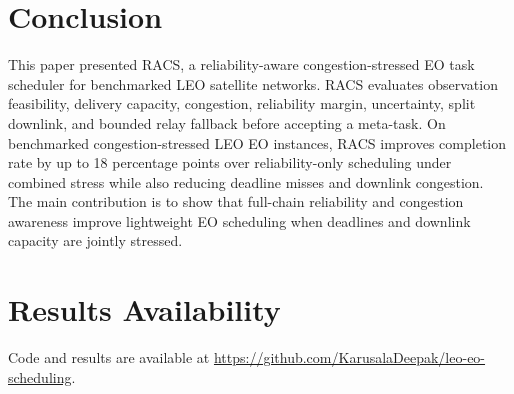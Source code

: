 \documentclass[conference]{IEEEtran}
\begin{document}
\section{Conclusion}
This paper presented RACS, a reliability-aware congestion-stressed EO task scheduler for benchmarked LEO satellite networks. RACS evaluates observation feasibility, delivery capacity, congestion, reliability margin, uncertainty, split downlink, and bounded relay fallback before accepting a meta-task. On benchmarked congestion-stressed LEO EO instances, RACS improves completion rate by up to 18 percentage points over reliability-only scheduling under combined stress while also reducing deadline misses and downlink congestion. The main contribution is to show that full-chain reliability and congestion awareness improve lightweight EO scheduling when deadlines and downlink capacity are jointly stressed.

\section*{Results Availability}
Code and results are available at \url{https://github.com/KarusalaDeepak/leo-eo-scheduling}.
\end{document}
